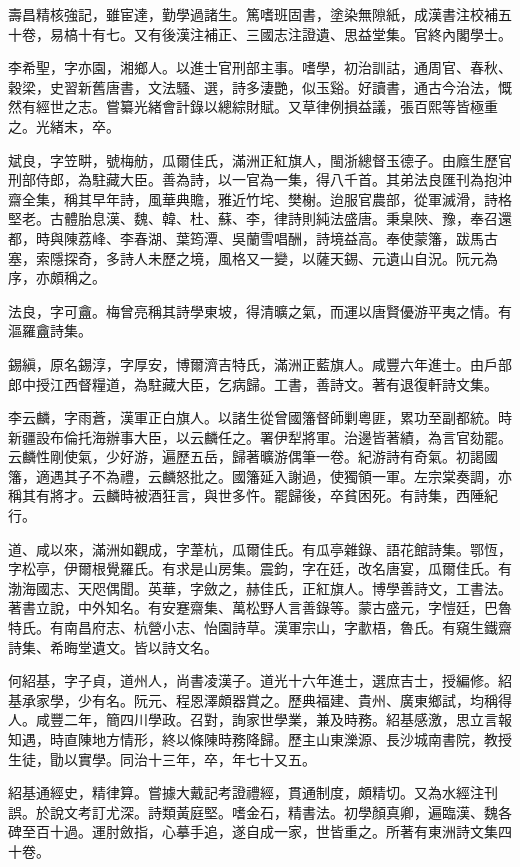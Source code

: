 \begin{pinyinscope}
壽昌精核強記，雖宦達，勤學過諸生。篤嗜班固書，塗染無隙紙，成漢書注校補五十卷，易槁十有七。又有後漢注補正、三國志注證遺、思益堂集。官終內閣學士。

李希聖，字亦園，湘鄉人。以進士官刑部主事。嗜學，初治訓詁，通周官、春秋、穀梁，史習新舊唐書，文法騷、選，詩多淒艷，似玉谿。好讀書，通古今治法，慨然有經世之志。嘗纂光緒會計錄以總綜財賦。又草律例損益議，張百熙等皆極重之。光緒末，卒。

斌良，字笠畊，號梅舫，瓜爾佳氏，滿洲正紅旗人，閩浙總督玉德子。由廕生歷官刑部侍郎，為駐藏大臣。善為詩，以一官為一集，得八千首。其弟法良匯刊為抱沖齋全集，稱其早年詩，風華典贍，雅近竹垞、樊榭。迨服官農部，從軍滅滑，詩格堅老。古體胎息漢、魏、韓、杜、蘇、李，律詩則純法盛唐。秉臬陜、豫，奉召還都，時與陳荔峰、李春湖、葉筠潭、吳蘭雪唱酬，詩境益高。奉使蒙籓，跋馬古塞，索隱探奇，多詩人未歷之境，風格又一變，以薩天錫、元遺山自況。阮元為序，亦頗稱之。

法良，字可盦。梅曾亮稱其詩學東坡，得清曠之氣，而運以唐賢優游平夷之情。有漚羅盦詩集。

錫縝，原名錫淳，字厚安，博爾濟吉特氏，滿洲正藍旗人。咸豐六年進士。由戶部郎中授江西督糧道，為駐藏大臣，乞病歸。工書，善詩文。著有退復軒詩文集。

李云麟，字雨蒼，漢軍正白旗人。以諸生從曾國籓督師剿粵匪，累功至副都統。時新疆設布倫托海辦事大臣，以云麟任之。署伊犁將軍。治邊皆著績，為言官劾罷。云麟性剛使氣，少好游，遍歷五岳，歸著曠游偶筆一卷。紀游詩有奇氣。初謁國籓，適遇其子不為禮，云麟怒批之。國籓延入謝過，使獨領一軍。左宗棠奏調，亦稱其有將才。云麟時被酒狂言，與世多忤。罷歸後，卒貧困死。有詩集，西陲紀行。

道、咸以來，滿洲如觀成，字葦杭，瓜爾佳氏。有瓜亭雜錄、語花館詩集。鄂恆，字松亭，伊爾根覺羅氏。有求是山房集。震鈞，字在廷，改名唐宴，瓜爾佳氏。有渤海國志、天咫偶聞。英華，字斂之，赫佳氏，正紅旗人。博學善詩文，工書法。著書立說，中外知名。有安蹇齋集、萬松野人言善錄等。蒙古盛元，字愷廷，巴魯特氏。有南昌府志、杭營小志、怡園詩草。漢軍宗山，字歗梧，魯氏。有窺生鐵齋詩集、希晦堂遺文。皆以詩文名。

何紹基，字子貞，道州人，尚書凌漢子。道光十六年進士，選庶吉士，授編修。紹基承家學，少有名。阮元、程恩澤頗器賞之。歷典福建、貴州、廣東鄉試，均稱得人。咸豐二年，簡四川學政。召對，詢家世學業，兼及時務。紹基感激，思立言報知遇，時直陳地方情形，終以條陳時務降歸。歷主山東濼源、長沙城南書院，教授生徒，勖以實學。同治十三年，卒，年七十又五。

紹基通經史，精律算。嘗據大戴記考證禮經，貫通制度，頗精切。又為水經注刊誤。於說文考訂尤深。詩類黃庭堅。嗜金石，精書法。初學顏真卿，遍臨漢、魏各碑至百十過。運肘斂指，心摹手追，遂自成一家，世皆重之。所著有東洲詩文集四十卷。


\end{pinyinscope}
